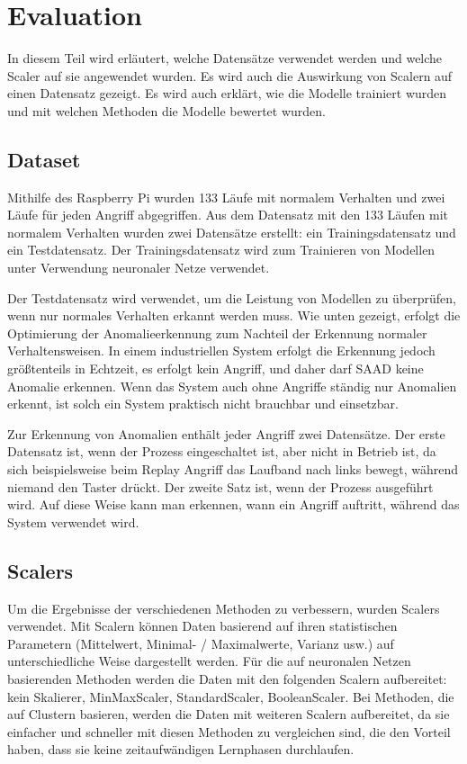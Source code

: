 \documentclass[12pt,a4paper]{scrartcl}
\numberwithin{equation}{section}
\begin{document}
 \newpage  %
\section{Evaluation}

In diesem Teil wird erläutert, welche Datensätze verwendet werden und welche Scaler auf sie angewendet wurden. Es wird auch die Auswirkung von Scalern auf einen Datensatz gezeigt. Es wird auch erklärt, wie die Modelle trainiert wurden und mit welchen Methoden die Modelle bewertet wurden. 

\subsection{Dataset}

Mithilfe des Raspberry Pi wurden 133 Läufe mit normalem Verhalten und zwei Läufe für jeden Angriff abgegriffen. Aus dem Datensatz mit den 133 Läufen mit normalem Verhalten wurden zwei Datensätze erstellt: ein Trainingsdatensatz und ein Testdatensatz. Der Trainingsdatensatz wird zum Trainieren von Modellen unter Verwendung neuronaler Netze verwendet.

Der Testdatensatz wird verwendet, um die Leistung von Modellen zu überprüfen, wenn nur normales Verhalten erkannt werden muss. Wie unten gezeigt, erfolgt die Optimierung der Anomalieerkennung zum Nachteil der Erkennung normaler Verhaltensweisen. In einem industriellen System erfolgt die Erkennung jedoch größtenteils in Echtzeit, es erfolgt kein Angriff, und daher darf SAAD keine Anomalie erkennen. Wenn das System auch ohne Angriffe ständig nur Anomalien erkennt, ist solch ein System praktisch nicht brauchbar und einsetzbar.

Zur Erkennung von Anomalien enthält jeder Angriff zwei Datensätze. Der erste Datensatz ist, wenn der Prozess eingeschaltet ist, aber nicht in Betrieb ist, da sich beispielsweise beim Replay Angriff das Laufband nach links bewegt, während niemand den Taster drückt. Der zweite Satz ist, wenn der Prozess ausgeführt wird. Auf diese Weise kann man erkennen, wann ein Angriff auftritt, während das System verwendet wird. 

\subsection{Scalers}

Um die Ergebnisse der verschiedenen Methoden zu verbessern, wurden Scalers verwendet. Mit Scalern können Daten basierend auf ihren statistischen Parametern (Mittelwert, Minimal- / Maximalwerte, Varianz usw.) auf unterschiedliche Weise dargestellt werden. Für die auf neuronalen Netzen basierenden Methoden werden die Daten mit den folgenden Scalern aufbereitet: kein Skalierer, MinMaxScaler, StandardScaler, BooleanScaler. Bei Methoden, die auf Clustern basieren, werden die Daten mit weiteren Scalern aufbereitet, da sie einfacher und schneller mit diesen Methoden zu vergleichen sind, die den Vorteil haben, dass sie keine zeitaufwändigen Lernphasen durchlaufen.
\end{document}
